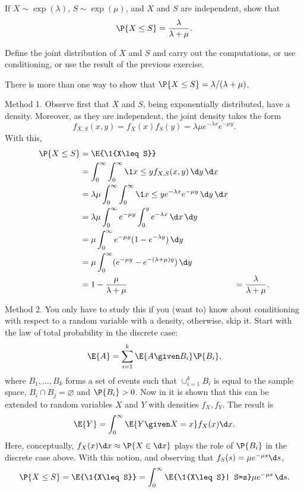 \begin{exercise}\label{ex:3}
   If $X\sim \exp(\lambda)$, $S\sim\exp(\mu)$, and $X$ and $S$ are independent, show that 
    \begin{equation*}
      \P{X\leq S} = \frac{\lambda}{\lambda+\mu}.
    \end{equation*}
    \begin{hint}
     Define the joint distribution of $X$ and $S$ and carry out
      the computations, or use conditioning, or use the result of the
      previous exercise.
    \end{hint}
\begin{solution}
There is more than one way to show that $\P{X\leq S} = \lambda/(\lambda+\mu)$.  

Method 1. 
Observe first that $X$ and $S$, being
exponentially distributed, have a density. Moreover, as they are
independent,  the joint density takes the form
\begin{equation*}
f_{X,S}(x,y) = f_X(x)f_S(y) = \lambda \mu e^{-\lambda x} e^{-\mu
  y}.
\end{equation*}
With this,
\begin{align*}
    \P{X\leq S} 
&= \E{\1{X\leq S}} \\
&= \int_0^\infty \int_0^\infty \1{x\leq y} f_{X,S}(x,y)\, \d y\,\d x\\
&= \lambda \mu \int_0^\infty \int_0^\infty \1{x\leq y} e^{-\lambda x} e^{-\mu y} \, \d y\,\d x\\
&= \lambda \mu \int_0^\infty e^{-\mu y} \int_0^y e^{-\lambda x}\, \d x \, \d y \\
&= \mu \int_0^\infty e^{-\mu y} (1-e^{-\lambda y})\,\d y\\
&= \mu \int_0^\infty (e^{-\mu y} - e^{-(\lambda +\mu)y} ) \,\d y\\
&= 1 - \frac{\mu}{\lambda + \mu} 
&= \frac{\lambda}{\lambda + \mu}.
\end{align*}

Method 2. You only have to study this if you (want to) know about conditioning with respect to a random variable with a density, otherwise, skip it.  Start with  the law of total probability in the discrete case: 
\begin{equation*}
  \E{A} = \sum_{i=1}^k \E{A\given B_i} \P{B_i},
\end{equation*}
where $B_1,\ldots, B_k$ forms a set of events such that $\cup_{i=1}^k B_i$ is equal to the sample space, $B_i\cap B_j = \varnothing$ and $\P{B_i}>0$. Now in \cite{capinski03:_probab_probl} it is shown that this can be extended to random variables $X$ and $Y$ with densities $f_X, f_Y$. The result is
\begin{equation*}
  \E{Y} = \int_0^\infty \E{Y\given X=x} f_X(x)\d x.
\end{equation*}
Here, conceptually, $f_X(x)\d x \approx \P{X\in \d x}$ plays the role of $\P{B_i}$ in the discrete case above. With this notion, and observing that $f_S(s) = \mu e^{-\mu s} \d s$,
\begin{equation*}
\P{X\leq S} = \E{\1{X\leq S}} = \int_0^\infty \E{\1{X\leq S}| S=s} \mu e^{-\mu s} \,  \d s.
\end{equation*}


\end{solution}
\end{exercise}
